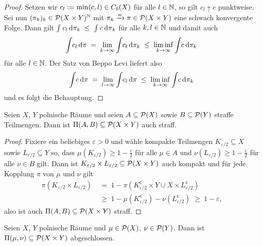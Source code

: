 \documentclass[../main/main.tex]{subfiles}
\begin{document}
	\begin{proof}
		Setzen wir $c_l \vcentcolon = \min(c, l) \in C_b(X)$ für alle $l \in \mathbb{N}$, so gilt $c_l \uparrow c$ punktweise. Sei nun $(\pi_k)_k \in \mathcal{P}(X \times Y)^{\mathbb{N}}$ mit $\pi_k \xrightarrow{w} \pi \in \mathcal{P}(X \times Y)$ eine schwach konvergente Folge. Dann gilt
		$\int_{} \, c_l \, \mathrm{d}\pi_k \; \leq \; \int_{} \, c \, \mathrm{d}\pi_k$ für alle $k, l \in \mathbb{N}$ und damit auch 
		\[ \int_{} \, c_l \, \mathrm{d}\pi \; = \; \lim_{k \to \infty} \int_{} \, c_l \, \mathrm{d}\pi_k \; \leq \; \liminf_{k \to \infty} \int_{} \, c \, \mathrm{d}\pi_k \]
		für alle $l \in \mathbb{N}$. Der Satz von Beppo Levi liefert also
		\[ \int_{} \, c \, \mathrm{d}\pi \; = \; \lim_{l \to \infty} \int_{} \, c_l \, \mathrm{d}\pi \; \leq \; \liminf_{k \to \infty} \int_{} \, c \, \mathrm{d}\pi_k \]
		und es folgt die Behauptung.
	\end{proof}

	\begin{Hilfssatz}
		\label{lem:couplingstight}
		Seien $X$, $Y$ polnische Räume und seien $A \subseteq \mathcal{P}(X)$ sowie $B \subseteq \mathcal{P}(Y)$ straffe Teilmengen. Dann ist $\Pi(A, B) \subseteq \mathcal{P}(X \times Y)$ auch straff.
	\end{Hilfssatz}

	\begin{proof}
		Fixiere ein beliebiges $\varepsilon > 0 $ und wähle kompakte Teilmengen $K_{\varepsilon/2} \subseteq X$ sowie $L_{\varepsilon/2} \subseteq Y$ so, dass $\mu(K_{\varepsilon/2}) \geq 1 - \frac{\varepsilon}{2}$ 
		für alle $\mu \in A$ und $\nu(L_{\varepsilon/2}) \geq 1 - \frac{\varepsilon}{2}$ für alle $\nu \in B$ gilt. Dann ist $K_{\varepsilon/2} \times L_{\varepsilon/2} \subseteq \mathcal{P}(X \times Y)$ auch kompakt und für jede Kopplung $\pi$ von $\mu$ und $\nu$ gilt
		\begin{align*}
			\pi(K_{\varepsilon/2} \times L_{\varepsilon/2}) \; &= \; 1 - \pi(K_{\varepsilon/2}^\mathsf{c} \times Y \cup X \times L_{\varepsilon/2}^\mathsf{c}) \\
			                                                   &\geq \; 1 - \mu(K_{\varepsilon/2}^\mathsf{c}) - \nu(L_{\varepsilon/2}^\mathsf{c}) \; \geq \; 1 - \varepsilon \text{,}
		\end{align*}
	also ist auch $\Pi(A, B) \subseteq \mathcal{P}(X \times Y)$ straff.
	\end{proof}

	\begin{Hilfssatz}
		\label{lem:couplingsclosed}
		Seien $X$, $Y$ polnische Räume und $\mu \in \mathcal{P}(X)$, $\nu \in \mathcal{P}(Y)$. Dann ist $\Pi(\mu, \nu) \subseteq \mathcal{P}(X \times Y)$ abgeschlossen.
	\end{Hilfssatz}
\end{document}
